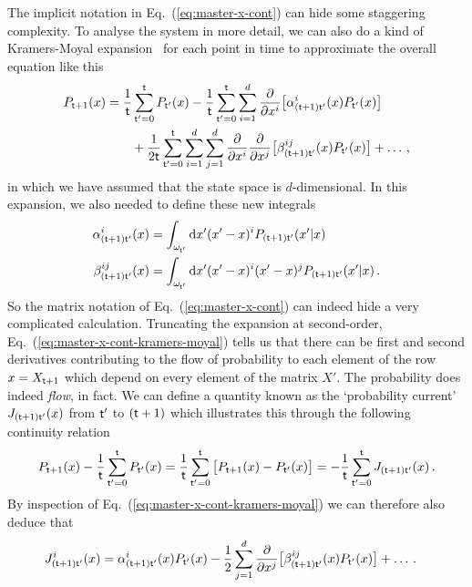 The implicit notation in Eq.~(\ref{eq:master-x-cont}) can hide some staggering complexity. To analyse the system in more detail, we can also do a kind of Kramers-Moyal expansion~\cite{kramers1940brownian,moyal1949stochastic} for each point in time to approximate the overall equation like this
\begin{align}
P_{{\sf t}+1}(x) &= \frac{1}{{\sf t}}\sum_{{\sf t}'=0}^{{\sf t}}P_{{\sf t}'}(x) - \frac{1}{{\sf t}}\sum_{{\sf t}'=0}^{{\sf t}}\sum_{i=1}^d\frac{\partial}{\partial x^i}\big[ \alpha^i_{({\sf t}+1){\sf t}'}(x)P_{{\sf t}'}(x)\big] \nonumber \\
& \qquad + \frac{1}{2{\sf t}}\sum_{{\sf t}'=0}^{{\sf t}}\sum_{i=1}^d\sum_{j=1}^d\frac{\partial}{\partial x^i}\frac{\partial}{\partial x^j}\big[ \beta^{ij}_{({\sf t}+1){\sf t}'}(x)P_{{\sf t}'}(x)\big] + \dots \label{eq:master-x-cont-kramers-moyal} \,,
\end{align}
in which we have assumed that the state space is $d$-dimensional. In this expansion, we also needed to define these new integrals
\begin{align}
\alpha^i_{({\sf t}+1){\sf t}'}(x) &=\int_{\omega_{{\sf t}'}} {\rm d}x'(x'-x)^iP_{({\sf t}+1){\sf t}'}(x'\vert x) \\
\beta^{ij}_{({\sf t}+1){\sf t}'}(x) &= \int_{\omega_{{\sf t}'}} {\rm d}x'(x'-x)^i(x'-x)^jP_{({\sf t}+1){\sf t}'}(x'\vert x) \,.
\end{align}
So the matrix notation of Eq.~(\ref{eq:master-x-cont}) can indeed hide a very complicated calculation. Truncating the expansion at second-order, Eq.~(\ref{eq:master-x-cont-kramers-moyal}) tells us that there can be first and second derivatives contributing to the flow of probability to each element of the row $x=X_{{\sf t}+1}$ which depend on every element of the matrix $X'$. The probability does indeed \emph{flow}, in fact. We can define a quantity known as the `probability current' $J_{({\sf t}+1){\sf t}'}(x)$ from ${\sf t}'$ to $({\sf t}+1)$ which illustrates this through the following continuity relation
\begin{align}
P_{{\sf t}+1}(x) - \frac{1}{{\sf t}}\sum_{{\sf t}'=0}^{{\sf t}}P_{{\sf t}'}(x) = \frac{1}{{\sf t}}\sum_{{\sf t}'=0}^{{\sf t}}\big[ P_{{\sf t}+1}(x) - P_{{\sf t}'}(x)\big] = - \frac{1}{{\sf t}}\sum_{{\sf t}'=0}^{{\sf t}}J_{({\sf t}+1){\sf t}'}(x) \,.
\end{align}
By inspection of Eq.~(\ref{eq:master-x-cont-kramers-moyal}) we can therefore also deduce that
\begin{align}
J^i_{({\sf t}+1){\sf t}'}(x) &= \alpha^i_{({\sf t}+1){\sf t}'}(x)P_{{\sf t}'}(x) - \frac{1}{2}\sum_{j=1}^d\frac{\partial}{\partial x^j}\big[ \beta^{ij}_{({\sf t}+1){\sf t}'}(x)P_{{\sf t}'}(x)\big] + \dots \,.
\end{align}

